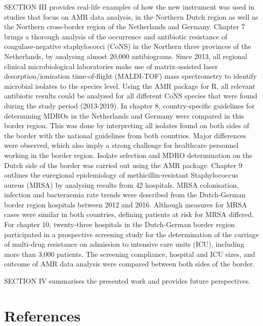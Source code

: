 \documentclass[
]{book}
\begin{document}
SECTION III provides real-life examples of how the new instrument was used in studies that focus on AMR data analysis, in the Northern Dutch region as well as the Northern cross-border region of the Netherlands and Germany. Chapter 7 brings a thorough analysis of the occurrence and antibiotic resistance of coagulase-negative staphylococci (CoNS) in the Northern three provinces of the Netherlands, by analysing almost 20,000 antibiograms. Since 2013, all regional clinical microbiological laboratories make use of matrix-assisted laser desorption/ionisation time-of-flight (MALDI-TOF) mass spectrometry to identify microbial isolates to the species level. Using the AMR package for R, all relevant antibiotic results could be analysed for all different CoNS species that were found during the study period (2013-2019). In chapter 8, country-specific guidelines for determining MDROs in the Netherlands and Germany were compared in this border region. This was done by interpreting all isolates found on both sides of the border with the national guidelines from both countries. Major differences were observed, which also imply a strong challenge for healthcare personnel working in the border region. Isolate selection and MDRO determination on the Dutch side of the border was carried out using the AMR package. Chapter 9 outlines the euregional epidemiology of methicillin-resistant Staphylococcus aureus (MRSA) by analysing results from 42 hospitals. MRSA colonisation, infection and bacteraemia rate trends were described from the Dutch-German border region hospitals between 2012 and 2016. Although measures for MRSA cases were similar in both countries, defining patients at risk for MRSA differed. For chapter 10, twenty-three hospitals in the Dutch-German border region participated in a prospective screening study for the determination of the carriage of multi-drug resistance on admission to intensive care units (ICU), including more than 3,000 patients. The screening compliance, hospital and ICU sizes, and outcome of AMR data analysis were compared between both sides of the border.

SECTION IV summarises the presented work and provides future perspectives.

\hypertarget{references}{%
\section*{References}\label{references}}
\end{document}
